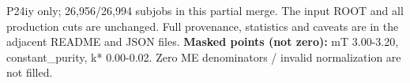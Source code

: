\documentclass[10pt,a4paper]{article}
\begin{document}
\medskip
{} P24iy only; 26,956/26,994 subjobs in this partial merge.
The input ROOT and all production cuts are unchanged.
Full provenance, statistics and caveats are in the adjacent README and JSON files.
\medskip\noindent\textbf{Masked points (not zero):} mT 3.00-3.20, constant\_purity, k* 0.00-0.02. Zero ME denominators / invalid normalization are not filled.
\clearpage



\end{document}
